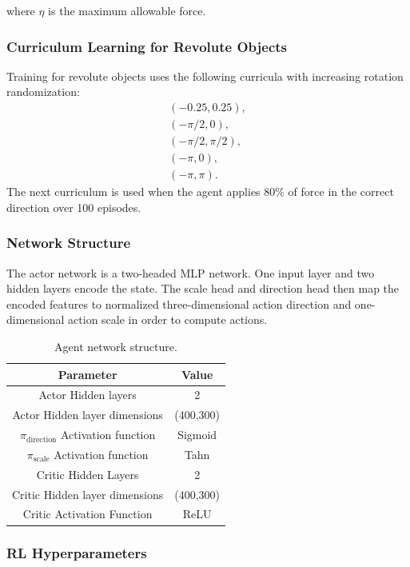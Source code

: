 where \(\eta\) is the maximum allowable force.

\subsubsection{Curriculum Learning for Revolute Objects}
Training for revolute objects uses the following curricula with increasing rotation randomization:
% 
\[
\begin{gathered}
(-0.25, 0.25), \\
(-\pi/2, 0), \\
(-\pi/2, \pi/2), \\
(-\pi, 0), \\
(-\pi, \pi).
\end{gathered}
\]
% 
The next curriculum is used when the agent applies 80\% of force in the correct direction over 100 episodes. 
\subsubsection{Network Structure}
The actor network is a two-headed MLP network. One input layer and two hidden layers encode the state. The scale head and direction head then map the encoded features to normalized three-dimensional action direction and one-dimensional action scale in order to compute actions.

\begin{table}[htbp]
\centering
\begin{tabular}{cc}
\toprule
\textbf{Parameter} & \textbf{Value} \\
\midrule
Actor Hidden layers & 2 \\
Actor Hidden layer dimensions & (400,300) \\
 $\pi_{\text{direction}}$ Activation function & Sigmoid \\
  $\pi_{\text{scale}}$ Activation function & Tahn \\
Critic Hidden Layers & 2 \\
Critic Hidden layer dimensions & (400,300) \\
Critic Activation Function & ReLU \\

\bottomrule
\end{tabular}
\caption{Agent network structure.}
\end{table}

\subsubsection{RL Hyperparameters}

